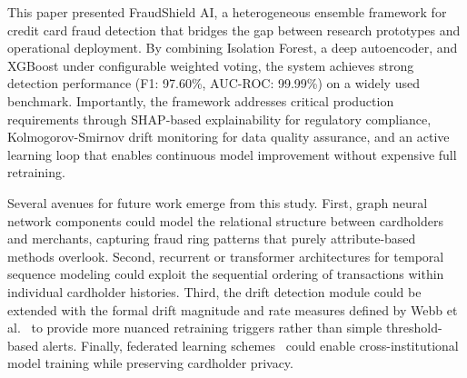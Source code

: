 \documentclass[conference,10pt]{IEEEtran}
\begin{document}
This paper presented FraudShield AI, a heterogeneous ensemble framework for credit card fraud detection that bridges the gap between research prototypes and operational deployment. By combining Isolation Forest, a deep autoencoder, and XGBoost under configurable weighted voting, the system achieves strong detection performance (F1: 97.60\%, AUC-ROC: 99.99\%) on a widely used benchmark. Importantly, the framework addresses critical production requirements through SHAP-based explainability for regulatory compliance, Kolmogorov-Smirnov drift monitoring for data quality assurance, and an active learning loop that enables continuous model improvement without expensive full retraining.

Several avenues for future work emerge from this study. First, graph neural network components could model the relational structure between cardholders and merchants, capturing fraud ring patterns that purely attribute-based methods overlook. Second, recurrent or transformer architectures for temporal sequence modeling could exploit the sequential ordering of transactions within individual cardholder histories. Third, the drift detection module could be extended with the formal drift magnitude and rate measures defined by Webb et al.~\cite{webb2016characterizing} to provide more nuanced retraining triggers rather than simple threshold-based alerts. Finally, federated learning schemes~\cite{carcillo2018combining} could enable cross-institutional model training while preserving cardholder privacy.

\balance
\end{document}
